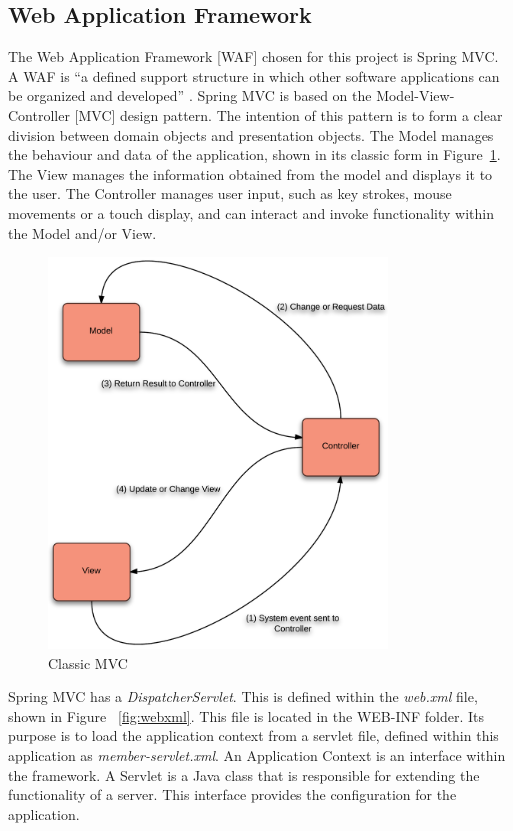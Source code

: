 \subsection{Web Application Framework}
The Web Application Framework [WAF] chosen for this project is Spring MVC. A WAF is “a defined support structure in which other software applications can be organized and developed” \parencite{shan2006taxonomy}. Spring MVC is based on the Model-View-Controller [MVC] design pattern. The intention of this pattern is to form a clear division between domain objects and presentation objects. The Model manages the behaviour and data of the application, shown in its classic form in Figure~\ref{fig:mvcclassic}. The View manages the information obtained from the model and displays it to the user. The Controller manages user input, such as key strokes, mouse movements or a touch display, and can interact and invoke functionality within the Model and/or View.

\begin{figure}[H]
\begin{center}
\includegraphics[width=9cm]{mvcclassic.png}
\end{center}
\caption{Classic MVC}
\label{fig:mvcclassic}
\end{figure}

Spring MVC has a \textit{DispatcherServlet}. This is defined within the \textit{web.xml} file, shown in Figure ~\ref{fig:webxml}. This file is located in the WEB-INF folder. Its purpose is to load the application context from a servlet file, defined within this application as \textit{member-servlet.xml}. An Application Context is an interface within the framework. A Servlet is a Java class that is responsible for extending the functionality of a server. This interface provides the configuration for the application. 

